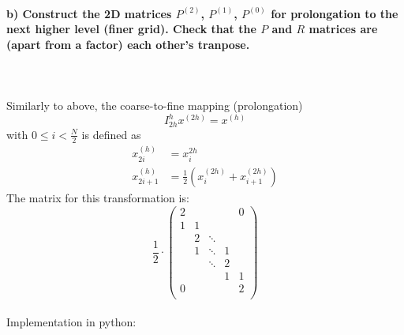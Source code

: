 \newpage
\paragraph{
    b) Construct the 2D matrices $P^{(2)}$, $P^{(1)}$, $P^{(0)}$
    for
    prolongation to the next higher level (finer grid). Check that
    the $P$ and $R$ matrices are (apart from a factor) each other’s
    tranpose.
} \ \\
    \\
    Similarly to above, the coarse-to-fine mapping (prolongation)
    \begin{equation}
        I_{2h}^h x^{(2h)}=x^{(h)}
    \end{equation}
    with $0\leq i<\frac{N}{2}$ is defined as
    \begin{align}
            x_{2i}^{(h)}
            &=x_i^{2h} \\
            x_{2i+1}^{(h)}
            &=\frac{1}{2}(x_i^{(2h)}+x_{i+1}^{(2h)})
    \end{align}
    The matrix for this transformation is:
    \begin{equation}
        \frac{1}{2}\cdot
        \begin{pmatrix}
            2      &   &        &   & 0 \\
            1      & 1 &        &   &        \\
                   & 2 & \ddots &   &        \\
                   & 1 & \ddots & 1 &        \\
                   &   & \ddots & 2 &        \\
                   &   &        & 1 & 1      \\
            0      &   &        &   & 2      \\

        \end{pmatrix}
    \end{equation} \ \\
    Implementation in python: 
    

